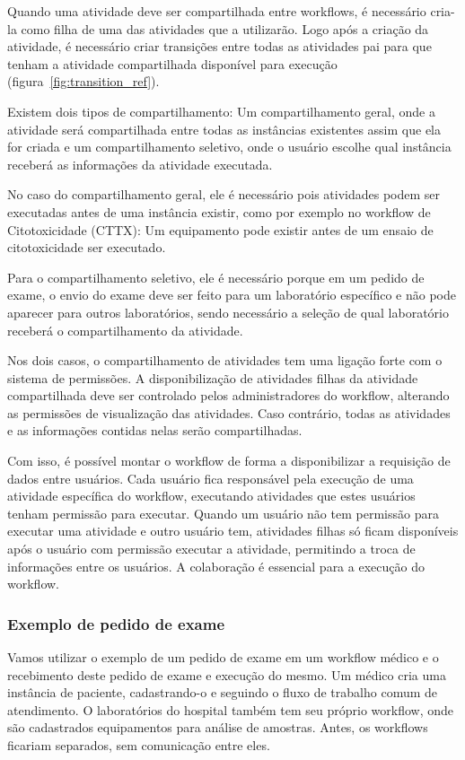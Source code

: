 Quando uma atividade deve ser compartilhada entre workflows, é necessário cria-la como filha de uma das atividades que a utilizarão. Logo após a criação da atividade, é necessário criar transições entre todas as atividades pai para que tenham a atividade compartilhada disponível para execução (figura~\ref{fig:transition_ref}).

Existem dois tipos de compartilhamento: Um compartilhamento geral, onde a atividade será compartilhada entre todas as instâncias existentes assim que ela for criada e um compartilhamento seletivo, onde o usuário escolhe qual instância receberá as informações da atividade executada.

No caso do compartilhamento geral, ele é necessário pois atividades podem ser executadas antes de uma instância existir, como por exemplo no workflow de Citotoxicidade (CTTX): Um equipamento pode existir antes de um ensaio de citotoxicidade ser executado.

Para o compartilhamento seletivo, ele é necessário porque em um pedido de exame, o envio do exame deve ser feito para um laboratório específico e não pode aparecer para outros laboratórios, sendo necessário a seleção de qual laboratório receberá o compartilhamento da atividade.

Nos dois casos, o compartilhamento de atividades tem uma ligação forte com o sistema de permissões. A disponibilização de atividades filhas da atividade compartilhada deve ser controlado pelos administradores do workflow, alterando as permissões de visualização das atividades. Caso contrário, todas as atividades e as informações contidas nelas serão compartilhadas.

Com isso, é possível montar o workflow de forma a disponibilizar a requisição de dados entre usuários. Cada usuário fica responsável pela execução de uma atividade específica do workflow, executando atividades que estes usuários tenham permissão para executar. Quando um usuário não tem permissão para executar uma atividade e outro usuário tem, atividades filhas só ficam disponíveis após o usuário com permissão executar a atividade, permitindo a troca de informações entre os usuários. A colaboração é essencial para a execução do workflow.

\subsubsection{Exemplo de pedido de exame}

Vamos utilizar o exemplo de um pedido de exame em um workflow médico e o recebimento deste pedido de exame e execução do mesmo.
Um médico cria uma instância de paciente, cadastrando-o e seguindo o fluxo de trabalho comum de atendimento.
O laboratórios do hospital também tem seu próprio workflow, onde são cadastrados equipamentos para análise de amostras.
Antes, os workflows ficariam separados, sem comunicação entre eles.

